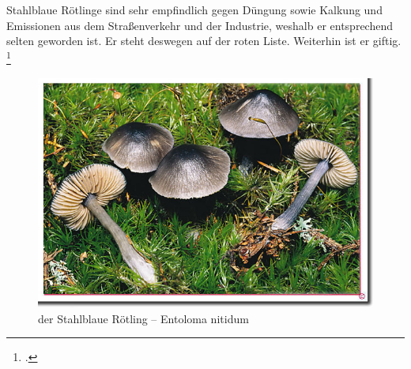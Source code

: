 \documentclass[a4paper,abstracton]{scrreprt}
\begin{document}
Stahlblaue Rötlinge sind sehr empfindlich gegen Düngung sowie Kalkung und Emissionen aus dem Straßenverkehr und der Industrie, weshalb er entsprechend selten geworden ist. Er steht deswegen auf der roten Liste. Weiterhin ist er giftig.
\footcite{stahlblau}
\begin{figure}[H]
\centering
\includegraphics[scale=0.4]{stahlblau}
\caption{der Stahlblaue Rötling -- Entoloma nitidum }
\label{fig:stahlblau}
\end{figure}

\printbibliography[heading=lit]
\end{document}
